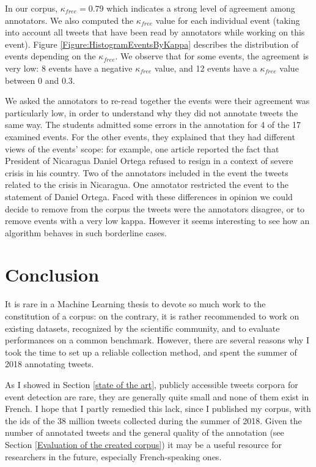 In our corpus, $\kappa_{free} = 0.79$ which indicates a strong level of agreement among annotators. We also computed the $\kappa_{free}$ value for  each individual event (taking into account all tweets that have been read by annotators while working on this event). Figure \ref{Figure:HistogramEventsByKappa} describes the distribution of events depending on the $\kappa_{free}$. We observe that for some events, the agreement is very low: 8 events have a negative $\kappa_{free}$ value, and 12 events have a $\kappa_{free}$ value between 0 and 0.3.


We asked the annotators to re-read together the events were their agreement was particularly low, in order to understand why they did not annotate tweets the same way. The students admitted some errors in the annotation for 4 of the 17 examined events. For the other events, they explained that they had different views of the events' scope: for example, one article reported the fact that President of Nicaragua Daniel Ortega refused to resign in a context of severe crisis in his country. Two of the annotators included in the event the tweets related to the crisis in Nicaragua. One annotator restricted the event to the statement of Daniel Ortega. Faced with these differences in opinion we could decide to remove from the corpus the tweets were the annotators disagree, or to remove events with a very low kappa. However it seems interesting to see how an algorithm behaves in such borderline cases.


\section{Conclusion}

It is rare in a Machine Learning thesis to devote so much work to the constitution of a corpus: on the contrary, it is rather recommended to work on existing datasets, recognized by the scientific community, and to evaluate  performances on a common benchmark. However, there are several reasons why I took the time to set up a reliable collection method, and spent the summer of 2018 annotating tweets. 

As I showed in Section \ref{state of the art}, publicly accessible tweets corpora for event detection are rare, they are generally quite small and none of them exist in French. I hope that I partly remedied this lack, since I published my corpus, with the ids of the 38 million tweets collected during the summer of 2018. Given the number of annotated tweets and the general quality of the annotation (see Section \ref{Evaluation of the created corpus}) it may be a useful resource for researchers in the future, especially French-speaking ones.


